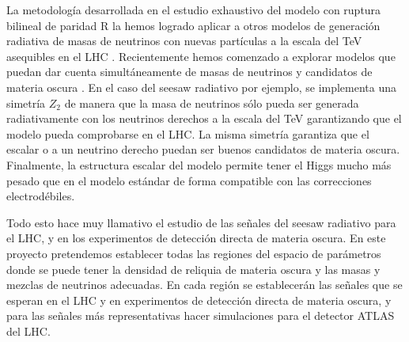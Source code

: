 La metodología desarrollada en el estudio exhaustivo del modelo con
ruptura bilineal de paridad R la hemos logrado aplicar a otros modelos
de generación radiativa de masas de neutrinos con nuevas partículas a
la escala del TeV asequibles en el LHC
\cite{Sierra:2008wj,AristizabalSierra:2006ri}. Recientemente hemos
comenzado a explorar modelos que puedan dar cuenta simultáneamente de
masas de neutrinos y candidatos de materia oscura
\cite{Hirsch:2005ag,Choi:2010jt,Sierra:2008wj}. En el caso del seesaw
radiativo por ejemplo, se implementa una simetría $Z_2$ de manera que
la masa de neutrinos sólo pueda ser generada radiativamente con los
neutrinos derechos a la escala del TeV garantizando que el modelo
pueda comprobarse en el LHC. La misma simetría garantiza que el
escalar o a un neutrino derecho puedan ser buenos candidatos de
materia oscura. Finalmente, la estructura escalar del modelo permite
tener el Higgs mucho más pesado que en el modelo estándar de forma
compatible con las correcciones electrodébiles. 
\begin{proyecto}
  Todo esto hace muy llamativo el estudio de las señales del seesaw
  radiativo para el LHC, y en los experimentos de detección directa de
  materia oscura. En este proyecto pretendemos establecer todas las
  regiones del espacio de parámetros donde se puede tener la densidad
  de reliquia de materia oscura y las masas y mezclas de neutrinos
  adecuadas. En cada región se establecerán las señales que se esperan
  en el LHC y en experimentos de detección directa de materia oscura,
  y para las señales más representativas hacer simulaciones para el
  detector ATLAS del LHC.
\end{proyecto}

